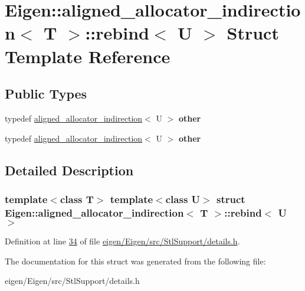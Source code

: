 \hypertarget{struct_eigen_1_1aligned__allocator__indirection_1_1rebind}{}\section{Eigen\+:\+:aligned\+\_\+allocator\+\_\+indirection$<$ T $>$\+:\+:rebind$<$ U $>$ Struct Template Reference}
\label{struct_eigen_1_1aligned__allocator__indirection_1_1rebind}
\subsection*{Public Types}
\begin{DoxyCompactItemize}
\item 
\mbox{\label{struct_eigen_1_1aligned__allocator__indirection_1_1rebind_accebeb01e8c70c6a047ecba5c6a8c545}} 
typedef \hyperlink{class_eigen_1_1aligned__allocator__indirection}{aligned\+\_\+allocator\+\_\+indirection}$<$ U $>$ {\bfseries other}
\item 
\mbox{\label{struct_eigen_1_1aligned__allocator__indirection_1_1rebind_accebeb01e8c70c6a047ecba5c6a8c545}} 
typedef \hyperlink{class_eigen_1_1aligned__allocator__indirection}{aligned\+\_\+allocator\+\_\+indirection}$<$ U $>$ {\bfseries other}
\end{DoxyCompactItemize}


\subsection{Detailed Description}
\subsubsection*{template$<$class T$>$\newline
template$<$class U$>$\newline
struct Eigen\+::aligned\+\_\+allocator\+\_\+indirection$<$ T $>$\+::rebind$<$ U $>$}



Definition at line \hyperlink{eigen_2_eigen_2src_2_stl_support_2details_8h_source_l00034}{34} of file \hyperlink{eigen_2_eigen_2src_2_stl_support_2details_8h_source}{eigen/\+Eigen/src/\+Stl\+Support/details.\+h}.



The documentation for this struct was generated from the following file\+:\begin{DoxyCompactItemize}
\item 
eigen/\+Eigen/src/\+Stl\+Support/details.\+h\end{DoxyCompactItemize}
